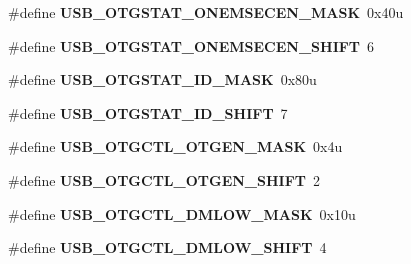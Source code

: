 \begin{DoxyCompactItemize}
\item 
\hypertarget{group___u_s_b___register___masks_gaf29778bce4dce2841774778e5c566bf5}{}\#define {\bfseries U\+S\+B\+\_\+\+O\+T\+G\+S\+T\+A\+T\+\_\+\+O\+N\+E\+M\+S\+E\+C\+E\+N\+\_\+\+M\+A\+S\+K}~0x40u\label{group___u_s_b___register___masks_gaf29778bce4dce2841774778e5c566bf5}

\item 
\hypertarget{group___u_s_b___register___masks_gaac9cb5de36e29af8366533e2c05c31ac}{}\#define {\bfseries U\+S\+B\+\_\+\+O\+T\+G\+S\+T\+A\+T\+\_\+\+O\+N\+E\+M\+S\+E\+C\+E\+N\+\_\+\+S\+H\+I\+F\+T}~6\label{group___u_s_b___register___masks_gaac9cb5de36e29af8366533e2c05c31ac}

\item 
\hypertarget{group___u_s_b___register___masks_gab1f78fae0de86d5ced423f41f9d6b098}{}\#define {\bfseries U\+S\+B\+\_\+\+O\+T\+G\+S\+T\+A\+T\+\_\+\+I\+D\+\_\+\+M\+A\+S\+K}~0x80u\label{group___u_s_b___register___masks_gab1f78fae0de86d5ced423f41f9d6b098}

\item 
\hypertarget{group___u_s_b___register___masks_ga4f674a8a6d13daeb25950cb78cfa625c}{}\#define {\bfseries U\+S\+B\+\_\+\+O\+T\+G\+S\+T\+A\+T\+\_\+\+I\+D\+\_\+\+S\+H\+I\+F\+T}~7\label{group___u_s_b___register___masks_ga4f674a8a6d13daeb25950cb78cfa625c}

\item 
\hypertarget{group___u_s_b___register___masks_ga6cdb9b59615dfc774914e37d44f17e3a}{}\#define {\bfseries U\+S\+B\+\_\+\+O\+T\+G\+C\+T\+L\+\_\+\+O\+T\+G\+E\+N\+\_\+\+M\+A\+S\+K}~0x4u\label{group___u_s_b___register___masks_ga6cdb9b59615dfc774914e37d44f17e3a}

\item 
\hypertarget{group___u_s_b___register___masks_ga45ccee22440e024d6e6096d5607372f6}{}\#define {\bfseries U\+S\+B\+\_\+\+O\+T\+G\+C\+T\+L\+\_\+\+O\+T\+G\+E\+N\+\_\+\+S\+H\+I\+F\+T}~2\label{group___u_s_b___register___masks_ga45ccee22440e024d6e6096d5607372f6}

\item 
\hypertarget{group___u_s_b___register___masks_ga929467feea7b1506c205dd78112a8a98}{}\#define {\bfseries U\+S\+B\+\_\+\+O\+T\+G\+C\+T\+L\+\_\+\+D\+M\+L\+O\+W\+\_\+\+M\+A\+S\+K}~0x10u\label{group___u_s_b___register___masks_ga929467feea7b1506c205dd78112a8a98}

\item 
\hypertarget{group___u_s_b___register___masks_ga11854093d47631b4f11f0c50bf7a063f}{}\#define {\bfseries U\+S\+B\+\_\+\+O\+T\+G\+C\+T\+L\+\_\+\+D\+M\+L\+O\+W\+\_\+\+S\+H\+I\+F\+T}~4\label{group___u_s_b___register___masks_ga11854093d47631b4f11f0c50bf7a063f}


\end{DoxyCompactItemize}
